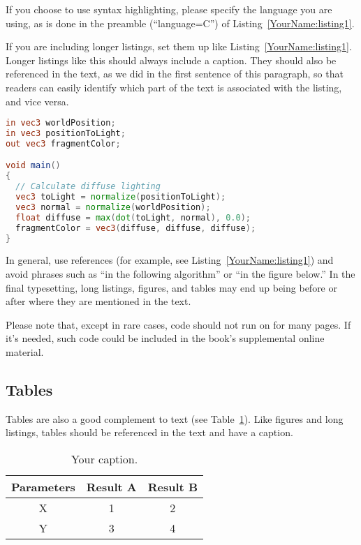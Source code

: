 If you choose to use syntax highlighting, please specify the language you are using, as is done in the preamble (``language=C'') of Listing~\ref{YourName:listing1}.

If you are including longer listings, set them up like Listing~\ref{YourName:listing1}. Longer listings like this should always include a caption. They should also be referenced in the text, as we did in the first sentence of this paragraph, so that readers can easily identify which part of the text is associated with the listing, and vice versa.

\begin{lstlisting}[language=GLSL,float={htb},caption={Your caption.},label={YourName:listing1}]
in vec3 worldPosition;
in vec3 positionToLight;
out vec3 fragmentColor;

void main()
{
  // Calculate diffuse lighting
  vec3 toLight = normalize(positionToLight);
  vec3 normal = normalize(worldPosition);
  float diffuse = max(dot(toLight, normal), 0.0);
  fragmentColor = vec3(diffuse, diffuse, diffuse);
}
\end{lstlisting}

In general, use references (for example, see Listing~\ref{YourName:listing1}) and avoid phrases such as ``in the following algorithm'' or ``in the figure below.'' In the final typesetting, long listings, figures, and tables may end up being before or after where they are mentioned in the text.

Please note that, except in rare cases, code should not run on for many pages. If it's needed, such code could be included in the book's supplemental online material.

\subsection{Tables}
Tables are also a good complement to text (see Table~\ref{YourName:table1}). Like figures and long listings, tables should be referenced in the text and have a caption.
\begin{table}[htb]\centering
\begin{tabular}{|c|c|c|}
\hline%
\small{Parameters} & \small{Result A} & \small{Result B}\\
\hline%
\small{X} & \small{1} & \small{2}\\
\hline%
\small{Y} & \small{3} & \small{4} \\
\hline%
\end{tabular}
 \caption{Your caption.}
 \label{YourName:table1}
\end{table}

